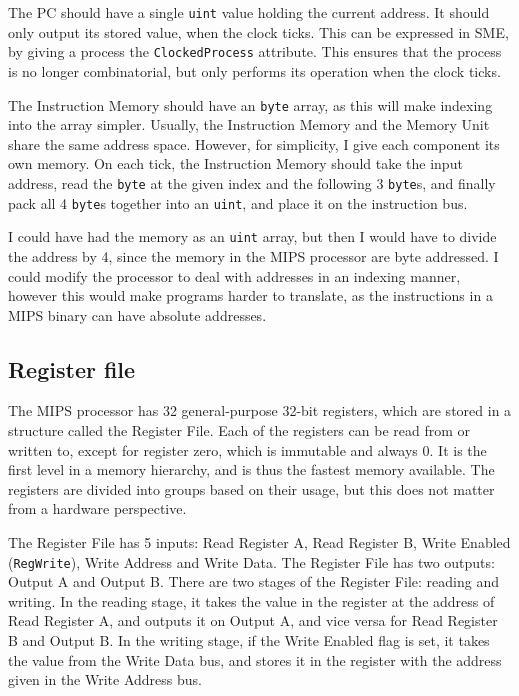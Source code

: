 The PC should have a single \texttt{uint} value holding the current address.
It should only output its stored value, when the clock ticks. This can be
expressed in SME, by giving a process the \texttt{ClockedProcess} attribute.
This ensures that the process is no longer combinatorial, but only performs
its operation when the clock ticks.

The Instruction Memory should have an \texttt{byte} array, as this will make
indexing into the array simpler. Usually, the Instruction Memory and the Memory
Unit share the same address space. However, for simplicity, I give each
component its own memory. On each tick, the Instruction Memory should take the
input address, read the \texttt{byte} at the given index and the following 3
\texttt{byte}s, and finally pack all 4 \texttt{byte}s together into an
\texttt{uint}, and place it on the instruction bus.

I could have had the memory as an \texttt{uint} array, but then I would have
to divide the address by 4, since the memory in the MIPS processor are byte
addressed. I could modify the processor to deal with addresses in an indexing
manner, however this would make programs harder to translate, as the
instructions in a MIPS binary can have absolute addresses.

\subsection{Register file}
The MIPS processor has 32 general-purpose 32-bit registers, which are stored in
a structure called the Register File. Each of the registers can be read from or
written to, except for register zero, which is immutable and always 0. It is
the first level in a memory hierarchy, and is thus the fastest memory
available. The registers are divided into groups based on their usage, but
this does not matter from a hardware perspective.

The Register File has 5 inputs: Read Register A, Read Register B, Write Enabled
(\texttt{RegWrite}), Write Address and Write Data. The Register File has two
outputs: Output A and Output B.  There are two stages of the Register File:
reading and writing. In the reading stage, it takes the value in the register
at the address of Read Register A, and outputs it on Output A, and vice versa
for Read Register B and Output B. In the writing stage, if the Write Enabled
flag is set, it takes the value from the Write Data bus, and stores it in the
register with the address given in the Write Address bus.

